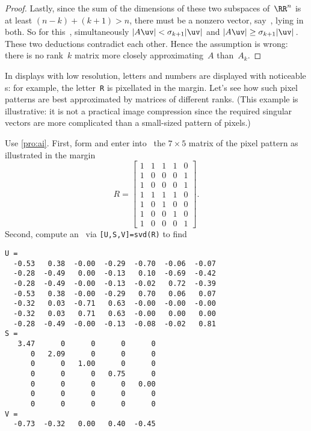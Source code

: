 \begin{proof}
Lastly, since the sum of the dimensions of these two subspaces of~\(\RR^n\) is at least \((n-k)+(k+1)>n\), there must be a nonzero vector, say~\uv, lying in both.
So for this~\uv, simultaneously \(|A\uv|<\sigma_{k+1}|\uv|\) and \(|A\uv|\geq\sigma_{k+1}|\uv|\)\,.
These two deductions contradict each other.
Hence the assumption is wrong: there is no rank~\(k\) matrix more closely approximating~\(A\) than~\(A_k\).
\end{proof}



\begin{example} \label{eg:}
In displays with low resolution, letters and numbers are displayed with noticeable s: for example, the letter~\verb|R| is pixellated in the margin.
\marginpar{}%
Let's see how such pixel patterns are best approximated by matrices of different ranks.
(This example is illustrative: it is not a practical image compression since the required singular vectors are more complicated than a small-sized pattern of pixels.)
\begin{solution} 
Use \autoref{pro:ai}.
First, form and enter into \script\ the \(7\times5\) matrix of the pixel pattern as illustrated in the margin
\begin{equation*}
R=\begin{bmatrix} 1&1&1&1&0
\\1&0&0&0&1
\\1&0&0&0&1
\\1&1&1&1&0
\\1&0&1&0&0
\\1&0&0&1&0
\\1&0&0&0&1 \end{bmatrix}.
\end{equation*}
Second, compute an \svd\ via \verb|[U,S,V]=svd(R)| to find \twodp
\begin{verbatim}
U =
  -0.53   0.38  -0.00  -0.29  -0.70  -0.06  -0.07
  -0.28  -0.49   0.00  -0.13   0.10  -0.69  -0.42
  -0.28  -0.49  -0.00  -0.13  -0.02   0.72  -0.39
  -0.53   0.38  -0.00  -0.29   0.70   0.06   0.07
  -0.32   0.03  -0.71   0.63  -0.00  -0.00  -0.00
  -0.32   0.03   0.71   0.63  -0.00   0.00   0.00
  -0.28  -0.49  -0.00  -0.13  -0.08  -0.02   0.81
S =
   3.47      0      0      0      0
      0   2.09      0      0      0
      0      0   1.00      0      0
      0      0      0   0.75      0
      0      0      0      0   0.00
      0      0      0      0      0
      0      0      0      0      0
V =
  -0.73  -0.32   0.00   0.40  -0.45

\end{verbatim}
\end{solution}
\end{example}
